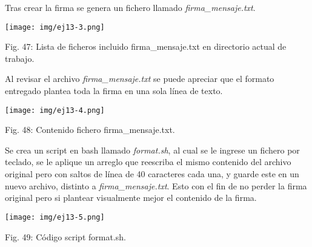 \documentclass[12pt,oneside,a4paper]{book}
\begin{document}
\vspace{2em}

\hspace{20pt}
Tras crear la firma se genera un fichero llamado \textit{firma\_mensaje.txt}.

\vspace{2em}

\begin{center}
    \texttt{[image: img/ej13-3.png]}
    
\vspace{0.1em}
    
    Fig. 47: Lista de ficheros incluido firma\_mensaje.txt en directorio actual de trabajo.
\end{center}

\vspace{2em}

\hspace{20pt}
Al revisar el archivo \textit{firma\_mensaje.txt} se puede apreciar que el formato entregado plantea toda la firma en una sola línea de texto. 

\vspace{2em}

\begin{center}
    \texttt{[image: img/ej13-4.png]}
    
\vspace{0.1em}
    
    Fig. 48: Contenido fichero firma\_mensaje.txt.
\end{center}

\vspace{2em}

\hspace{20pt}
Se crea un script en bash llamado \textit{format.sh}, al cual se le ingrese un fichero por teclado, se le aplique un arreglo que reescriba el mismo contenido del archivo original pero con saltos de línea de 40 caracteres cada una, y guarde este en un nuevo archivo, distinto a \textit{firma\_mensaje.txt}. Esto con el fin de no perder la firma original pero si plantear visualmente mejor el contenido de la firma.

\vspace{2em}

\begin{center}
    \texttt{[image: img/ej13-5.png]}
    
\vspace{0.1em}
    
    Fig. 49: Código script format.sh.
\end{center}
\end{document}

